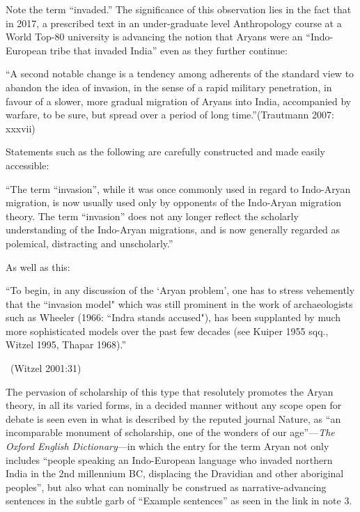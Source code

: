 Note the term “invaded.” The significance of this observation lies in the fact that in 2017, a prescribed text in an under-graduate level Anthropology course at a World Top-80 university is advancing the notion that Aryans were an “Indo-European tribe that invaded India” even as they further continue:

\begin{myquote}
“A second notable change is a tendency among adherents of the standard view to abandon the idea of invasion, in the sense of a rapid military penetration, in favour of a slower, more gradual migration of Aryans into India, accompanied by warfare, to be sure, but spread over a period of long time.”\hfill (Trautmann 2007: xxxvii)
\end{myquote}

Statements such as the following are carefully constructed and made easily accessible:

\begin{myquote}
“The term “invasion”, while it was once commonly used in regard to Indo-Aryan migration, is now usually used only by opponents of the Indo-Aryan migration theory. The term “invasion” does not any longer reflect the scholarly understanding of the Indo-Aryan migrations, and is now generally regarded as polemical, distracting and unscholarly.”
\end{myquote}

As well as this:

\begin{myquote}
“To begin, in any discussion of the `Aryan problem', one has to stress vehemently that the ``invasion model" which was still prominent in the work of archaeologists such as Wheeler (1966: ``Indra stands accused"), has been supplanted by much more sophisticated models over the past few decades (see Kuiper 1955 sqq., Witzel 1995, Thapar 1968).”

~\hfill (Witzel 2001:31)
\end{myquote}

The pervasion of scholarship of this type that resolutely promotes the Aryan theory, in all its varied forms, in a decided manner without any scope open for debate is seen even in what is described by the reputed journal Nature, as “an incomparable monument of scholarship, one of the wonders of our age”—\textit{The Oxford English Dictionary}—in which the entry for the term Aryan not only includes “people speaking an Indo-European language who invaded northern India in the 2nd millennium BC, displacing the Dravidian and other aboriginal peoples”, but also what can nominally be construed as narrative-advancing sentences in the subtle garb of “Example sentences” as seen in the link in note 3.

